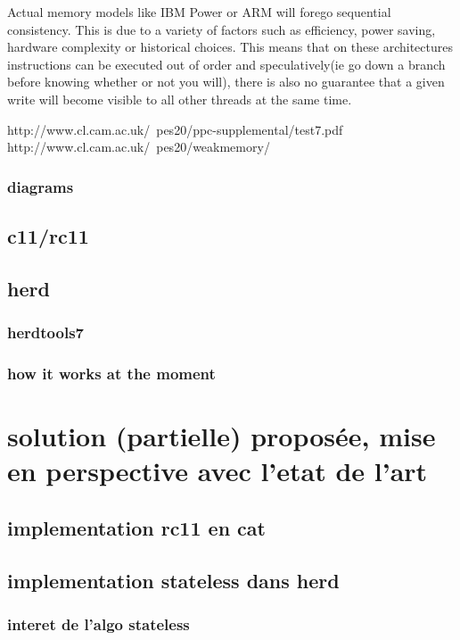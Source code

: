 \documentclass[a4]{article}
\begin{document}
Actual memory models like IBM Power or ARM will forego sequential consistency. This is due to a variety of factors such as efficiency, power saving, hardware complexity or historical choices. This means that on these architectures instructions can be executed out of order and speculatively(ie go down a branch before knowing whether or not you will), there is also no guarantee that a given write will become visible to all other threads at the same time.

http://www.cl.cam.ac.uk/~pes20/ppc-supplemental/test7.pdf
http://www.cl.cam.ac.uk/~pes20/weakmemory/

\subsubsection{diagrams}


\subsection{c11/rc11}

\subsection{herd}

\subsubsection{herdtools7}

\subsubsection{how it works at the moment}

\section{solution (partielle) proposée, mise en perspective avec l'etat de l'art}

\subsection{implementation rc11 en cat}

\subsection{implementation stateless dans herd}

\subsubsection{interet de l'algo stateless}
\end{document}
